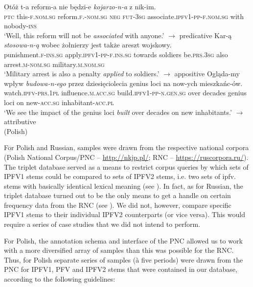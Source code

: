 \documentclass[output=paper]{langscibook}
\begin{document}
\ea\label{wiem:ex:associated}{\gll
{Otóż} {t-a} {reform-a} {nie} {będzi-e} \textit{{kojarzo-n-a}} {z} {nik-im}.\\
\textsc{ptc} this-\textsc{f.nom.sg} reform.\textsc{f.-nom.sg} \textsc{neg} \textsc{fut-3sg} associate.\textsc{ipfv1-pp-f.nom.sg} with nobody-\textsc{ins}\\
\glt ‘Well, this reform will not be \textit{associated} with anyone.’\hfill
$\rightarrow$ predicative
}
\ex\label{wiem:ex:applied}{\gll
{Kar-ą} {\textit{stosowa-n-ą}} {wobec} {żołnierzy} {jest} {także} {areszt} {wojskowy}.\\
punishment.\textsc{f-ins.sg} apply.\textsc{ipfv1-pp-f.ins.sg} towards soldiers be.\textsc{prs.3sg} also arrest.\textsc{m-nom.sg} military.\textsc{m.nom.sg}\\
\glt ‘Military arrest is also a penalty \textit{applied} to soldiers.’ \hfill
$\rightarrow$ appositive
}
\ex\label{wiem:ex:built}{\gll
{Ogląda-my} {wpływ} {\textit{budowa-n-ego}} {przez} {dziesięciolecia} {genius} {loci} {na} {now-ych} {mieszkańc-ów}.\\
watch.\textsc{ipfv-prs.1pl} influence.\textsc{m.acc.sg} build.\textsc{ipfv1-pp-n.gen.sg} over decades genius loci on new-\textsc{acc.sg} inhabitant-\textsc{acc.pl}\\
\glt ‘We see the impact of the genius loci \textit{built} over decades on new inhabitants.’ \hfill
$\rightarrow$ attributive\\\hfill (Polish)
}
\z

\noindent For Polish and Russian, samples were drawn from the respective national corpora (Polish National Corpus/PNC -- \url{http://nkjp.pl/}; RNC -- \url{https://ruscorpora.ru/}). The triplet database served as a means to restrict corpus queries by which sets of IPFV1 stems could be compared to sets of IPFV2 stems, i.e. two sets of ipfv. stems with basically identical lexical meaning (see ). In fact, as for Russian, the triplet database turned out to be the only means to get a handle on certain frequency data from the RNC (see ). We did not, however, compare specific IPFV1 stems to their individual IPFV2 counterparts (or vice versa). This would require a series of case studies that we did not intend to perform.

For Polish, the annotation schema and interface of the PNC allowed us to work with a more diversified array of samples than this was possible for the RNC. Thus, for Polish separate series of samples (à five periods) were drawn from the PNC for IPFV1, PFV and IPFV2 stems that were contained in our database, according to the following guidelines:
\end{document}
